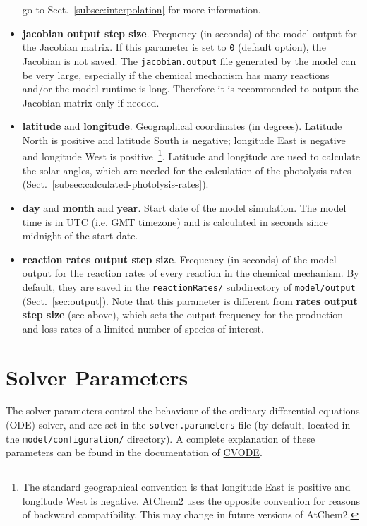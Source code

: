 \begin{itemize}
  go to Sect.~\ref{subsec:interpolation} for more information.
\item \textbf{jacobian output step size}. Frequency (in seconds) of
  the model output for the Jacobian matrix. If this parameter is set
  to \texttt{0} (default option), the Jacobian is not saved. The
  \texttt{jacobian.output} file generated by the model can be very
  large, especially if the chemical mechanism has many reactions
  and/or the model runtime is long. Therefore it is recommended to
  output the Jacobian matrix only if needed.
\item \textbf{latitude} and \textbf{longitude}. Geographical
  coordinates (in degrees). Latitude North is positive and latitude
  South is negative; longitude East is negative and longitude West is
  positive~\footnote{The standard geographical convention is that
    longitude East is positive and longitude West is negative. AtChem2
    uses the opposite convention for reasons of backward
    compatibility. This may change in future versions of
    AtChem2.}. Latitude and longitude are used to calculate the solar
  angles, which are needed for the calculation of the photolysis rates
  (Sect.~\ref{subsec:calculated-photolysis-rates}).
\item \textbf{day} and \textbf{month} and \textbf{year}. Start date of
  the model simulation. The model time is in UTC (i.e. GMT timezone)
  and is calculated in seconds since midnight of the start date.
\item \textbf{reaction rates output step size}. Frequency (in seconds)
  of the model output for the reaction rates of every reaction in the
  chemical mechanism. By default, they are saved in the
  \texttt{reactionRates/} subdirectory of \texttt{model/output}
  (Sect.~\ref{sec:output}). Note that this parameter is different from
  \textbf{rates output step size} (see above), which sets the output
  frequency for the production and loss rates of a limited number of
  species of interest.
\end{itemize}

\section{Solver Parameters} \label{sec:solver-parameters}

The solver parameters control the behaviour of the ordinary
differential equations (ODE) solver, and are set in the
\texttt{solver.parameters} file (by default, located in the
\texttt{model/configuration/} directory). A complete explanation of
these parameters can be found in the documentation of
\href{https://computing.llnl.gov/projects/sundials/cvode}{CVODE}.

